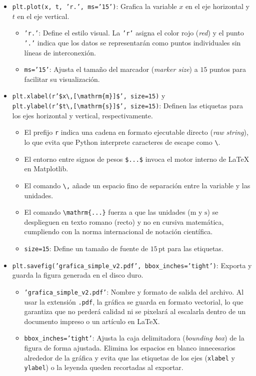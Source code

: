 \documentclass[12pt]{article}
\begin{document}
\begin{itemize}
    \item \texttt{plt.plot(x, t, 'r.', ms='15')}: Grafica la variable $x$ en el eje horizontal y $t$ en el eje vertical.
    \begin{itemize}
        \item \texttt{'r.'}: Define el estilo visual. La \texttt{'r'} asigna el color rojo (\textit{red}) y el punto \texttt{'.'} indica que los datos se representarán como puntos individuales sin líneas de interconexión.
        \item \texttt{ms='15'}: Ajusta el tamaño del marcador (\textit{marker size}) a $15$ puntos para facilitar su visualización.
    \end{itemize}
    
    \item \texttt{plt.xlabel(r'\$x\textbackslash,[\textbackslash{}mathrm\{m\}]\$', size=15)} y \\
    \texttt{plt.ylabel(r'\$t\textbackslash,[\textbackslash{}mathrm\{s\}]\$', size=15)}: Definen las etiquetas para los ejes horizontal y vertical, respectivamente.
    \begin{itemize}
        \item El prefijo \texttt{r} indica una cadena en formato ejecutable directo (\textit{raw string}), lo que evita que Python interprete caracteres de escape como \texttt{\textbackslash}.
        \item El entorno entre signos de pesos \texttt{\$...\$} invoca el motor interno de \LaTeX{} en Matplotlib.
        \item El comando \texttt{\textbackslash,} añade un espacio fino de separación entre la variable y las unidades.
        \item El comando \texttt{\textbackslash{}mathrm\{...\}} fuerza a que las unidades ($\mathrm{m}$ y $\mathrm{s}$) se desplieguen en texto romano (recto) y no en cursiva matemática, cumpliendo con la norma internacional de notación científica.
        \item \texttt{size=15}: Define un tamaño de fuente de $15$\,pt para las etiquetas.
    \end{itemize}

    \item \texttt{plt.savefig('grafica\_simple\_v2.pdf', bbox\_inches='tight')}: Exporta y guarda la figura generada en el disco duro.
    \begin{itemize}
        \item \texttt{'grafica\_simple\_v2.pdf'}: Nombre y formato de salida del archivo. Al usar la extensión \texttt{.pdf}, la gráfica se guarda en formato vectorial, lo que garantiza que no perderá calidad ni se pixelará al escalarla dentro de un documento impreso o un artículo en \LaTeX.
        \item \texttt{bbox\_inches='tight'}: Ajusta la caja delimitadora (\textit{bounding box}) de la figura de forma ajustada. Elimina los espacios en blanco innecesarios alrededor de la gráfica y evita que las etiquetas de los ejes (\texttt{xlabel} y \texttt{ylabel}) o la leyenda queden recortadas al exportar.
    \end{itemize}
    

\end{itemize}
\end{document}
